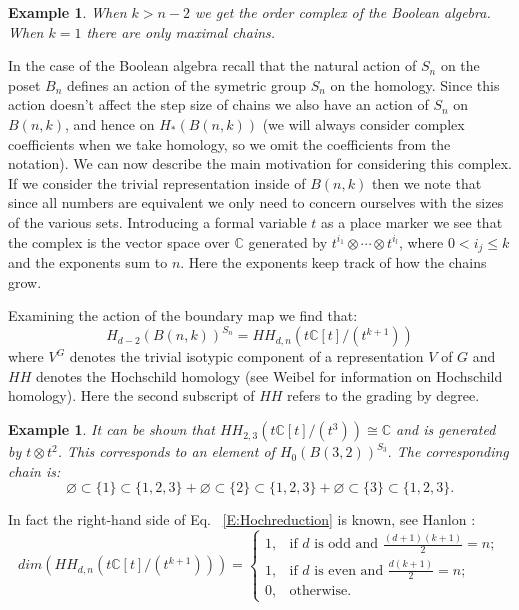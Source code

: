\documentclass{amsart}
\newtheorem{example}[theorem]{Example}
\newcommand{\C}{\mathbb{C}}
\begin{document}
\begin{example} When $k > n-2$ we get the order complex of the Boolean algebra. When $k=1$ there are only maximal chains.
\end{example}


In the case of the Boolean algebra recall that
the natural action of $S_n$ on the poset $B_n$ defines an action of the symetric group $S_n$ on the homology. Since this action doesn't 
affect the step size of chains we also have an action of $S_n$ on $B(n, k)$, and hence on $H_*(B(n, k))$ (we will always 
consider
complex coefficients when we take homology, so we omit the coefficients from the notation). We can now describe the
main motivation for considering this complex. If we consider the trivial representation inside of $B(n, k)$ then we
note that since all numbers are equivalent we only need to concern ourselves with the sizes of the various sets. 
Introducing a formal variable $t$ as a place marker we see that the complex is the vector space over $\C$ generated
by $t^{i_1}\otimes \cdots \otimes t^{i_l}$, where $0 <i_j \le k$ and the exponents sum to $n$.
 Here the exponents keep track of how the chains grow. 



Examining the action of the boundary map we find that:
\begin{equation} \label{E:Hochreduction}
  H_{d-2}(B(n, k))^{S_n} = HH_{d, n}(t\C[t]/(t^{k+1}))
\end{equation}
where $V^G$  denotes the trivial isotypic component of a representation $V$ of $G$ and $HH$ denotes the Hochschild 
homology (see Weibel \cite{Weibel} for information on Hochschild homology). Here the second 
subscript of $HH$ refers to the grading by degree. 

\begin{example}

  It can be shown that $HH_{2,3}(t\C[t]/(t^3)) \cong \C$ and is generated by $t \otimes t^2$. 
  This  
  corresponds to an element of $H_0(B(3, 2))^{S_3}.$ The corresponding chain is:
  $$ \varnothing \subset \{1\} \subset \{1, 2, 3\} + \varnothing \subset \{2\} \subset \{1, 2, 3\} + \varnothing \subset 
     \{3\} \subset \{1, 2, 3\}.$$
\end{example}

In fact the right-hand side of Eq. ~\ref{E:Hochreduction} is known, see 
Hanlon \cite{HanlonMac}:
\begin{equation} \label{E:HH}
  dim(HH_{d, n}(t\C[t]/(t^{k+1}))) = 
  \begin{cases} 
   1, &\text{if $d$ is odd and $\frac{(d+1)(k+1)}{2} = n;$}\\
   1, &\text{if $d$ is even and $\frac{d(k+1)}{2} = n;$}\\
   0, &\text{otherwise.}
  \end{cases}
\end{equation}
\end{document}
